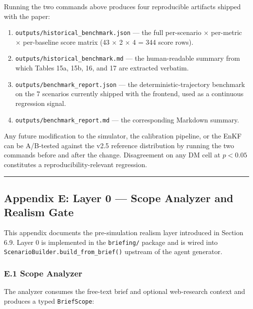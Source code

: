 \documentclass[
]{article}
\providecommand{\tightlist}{%
  \setlength{\itemsep}{0pt}\setlength{\parskip}{0pt}}
\begin{document}
Running the two commands above produces four reproducible artifacts
shipped with the paper:

\begin{enumerate}
\def\labelenumi{\arabic{enumi}.}
\tightlist
\item
  \texttt{outputs/historical\_benchmark.json} --- the full per-scenario
  × per-metric × per-baseline score matrix (43 × 2 × 4 = 344 score
  rows).
\item
  \texttt{outputs/historical\_benchmark.md} --- the human-readable
  summary from which Tables 15a, 15b, 16, and 17 are extracted verbatim.
\item
  \texttt{outputs/benchmark\_report.json} --- the
  deterministic-trajectory benchmark on the 7 scenarios currently
  shipped with the frontend, used as a continuous regression signal.
\item
  \texttt{outputs/benchmark\_report.md} --- the corresponding Markdown
  summary.
\end{enumerate}

Any future modification to the simulator, the calibration pipeline, or
the EnKF can be A/B-tested against the v2.5 reference distribution by
running the two commands before and after the change. Disagreement on
any DM cell at \(p < 0.05\) constitutes a reproducibility-relevant
regression.

\begin{center}\rule{0.5\linewidth}{0.5pt}\end{center}

\subsection{Appendix E: Layer 0 --- Scope Analyzer and Realism
Gate}\label{appendix-e-layer-0-scope-analyzer-and-realism-gate}

This appendix documents the pre-simulation realism layer introduced in
Section 6.9. Layer 0 is implemented in the \texttt{briefing/} package
and is wired into \texttt{ScenarioBuilder.build\_from\_brief()} upstream
of the agent generator.

\subsubsection{E.1 Scope Analyzer}\label{e.1-scope-analyzer}

The analyzer consumes the free-text brief and optional web-research
context and produces a typed \texttt{BriefScope}:
\end{document}
